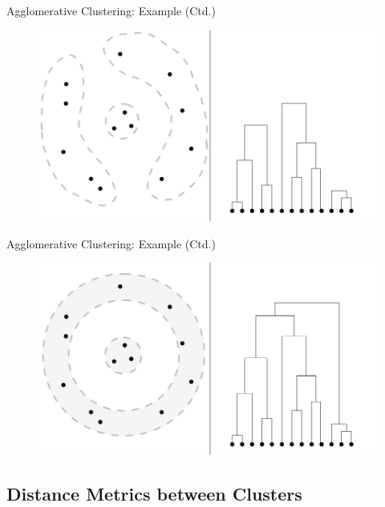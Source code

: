 \begin{frame}{Agglomerative Clustering: Example (Ctd.)}{}
	\begin{figure}
		\centering
		\includegraphics[scale=0.4]{12_clustering/02_img/aggl_clust_5}
	\end{figure}
\end{frame}


\begin{frame}{Agglomerative Clustering: Example (Ctd.)}{}
	\begin{figure}
		\centering
		\includegraphics[scale=0.4]{12_clustering/02_img/aggl_clust_6}
	\end{figure}
\end{frame}


\subsection{Distance Metrics between Clusters}

